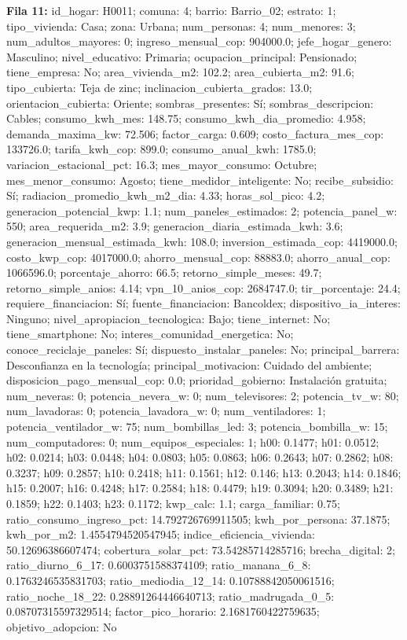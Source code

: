 {\footnotesize\textbf{Fila 11:} id\_hogar: H0011; comuna: 4; barrio: Barrio\_02; estrato: 1; tipo\_vivienda: Casa; zona: Urbana; num\_personas: 4; num\_menores: 3; num\_adultos\_mayores: 0; ingreso\_mensual\_cop: 904000.0; jefe\_hogar\_genero: Masculino; nivel\_educativo: Primaria; ocupacion\_principal: Pensionado; tiene\_empresa: No; area\_vivienda\_m2: 102.2; area\_cubierta\_m2: 91.6; tipo\_cubierta: Teja de zinc; inclinacion\_cubierta\_grados: 13.0; orientacion\_cubierta: Oriente; sombras\_presentes: Sí; sombras\_descripcion: Cables; consumo\_kwh\_mes: 148.75; consumo\_kwh\_dia\_promedio: 4.958; demanda\_maxima\_kw: 72.506; factor\_carga: 0.609; costo\_factura\_mes\_cop: 133726.0; tarifa\_kwh\_cop: 899.0; consumo\_anual\_kwh: 1785.0; variacion\_estacional\_pct: 16.3; mes\_mayor\_consumo: Octubre; mes\_menor\_consumo: Agosto; tiene\_medidor\_inteligente: No; recibe\_subsidio: Sí; radiacion\_promedio\_kwh\_m2\_dia: 4.33; horas\_sol\_pico: 4.2; generacion\_potencial\_kwp: 1.1; num\_paneles\_estimados: 2; potencia\_panel\_w: 550; area\_requerida\_m2: 3.9; generacion\_diaria\_estimada\_kwh: 3.6; generacion\_mensual\_estimada\_kwh: 108.0; inversion\_estimada\_cop: 4419000.0; costo\_kwp\_cop: 4017000.0; ahorro\_mensual\_cop: 88883.0; ahorro\_anual\_cop: 1066596.0; porcentaje\_ahorro: 66.5; retorno\_simple\_meses: 49.7; retorno\_simple\_anios: 4.14; vpn\_10\_anios\_cop: 2684747.0; tir\_porcentaje: 24.4; requiere\_financiacion: Sí; fuente\_financiacion: Bancoldex; dispositivo\_ia\_interes: Ninguno; nivel\_apropiacion\_tecnologica: Bajo; tiene\_internet: No; tiene\_smartphone: No; interes\_comunidad\_energetica: No; conoce\_reciclaje\_paneles: Sí; dispuesto\_instalar\_paneles: No; principal\_barrera: Desconfianza en la tecnología; principal\_motivacion: Cuidado del ambiente; disposicion\_pago\_mensual\_cop: 0.0; prioridad\_gobierno: Instalación gratuita; num\_neveras: 0; potencia\_nevera\_w: 0; num\_televisores: 2; potencia\_tv\_w: 80; num\_lavadoras: 0; potencia\_lavadora\_w: 0; num\_ventiladores: 1; potencia\_ventilador\_w: 75; num\_bombillas\_led: 3; potencia\_bombilla\_w: 15; num\_computadores: 0; num\_equipos\_especiales: 1; h00: 0.1477; h01: 0.0512; h02: 0.0214; h03: 0.0448; h04: 0.0803; h05: 0.0863; h06: 0.2643; h07: 0.2862; h08: 0.3237; h09: 0.2857; h10: 0.2418; h11: 0.1561; h12: 0.146; h13: 0.2043; h14: 0.1846; h15: 0.2007; h16: 0.4248; h17: 0.2584; h18: 0.4479; h19: 0.3094; h20: 0.3489; h21: 0.1859; h22: 0.1403; h23: 0.1172; kwp\_calc: 1.1; carga\_familiar: 0.75; ratio\_consumo\_ingreso\_pct: 14.792726769911505; kwh\_por\_persona: 37.1875; kwh\_por\_m2: 1.4554794520547945; indice\_eficiencia\_vivienda: 50.12696386607474; cobertura\_solar\_pct: 73.54285714285716; brecha\_digital: 2; ratio\_diurno\_6\_17: 0.6003751588374109; ratio\_manana\_6\_8: 0.1763246535831703; ratio\_mediodia\_12\_14: 0.10788842050061516; ratio\_noche\_18\_22: 0.28891264446640713; ratio\_madrugada\_0\_5: 0.08707315597329514; factor\_pico\_horario: 2.1681760422759635; objetivo\_adopcion: No\par}
